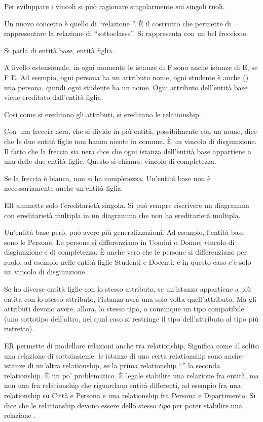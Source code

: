 Per sviluppare i vincoli si pu\`o ragionare singolarmente sui singoli ruoli.

Un nuovo concetto \`e quello di ``relazione \isa''. \`E il costrutto che permette di rappresentare la relazione di ``sottoclasse''. Si rappresenta con un bel freccione.

Si parla di entit\`a base, entit\`a figlia.

A livello estensionale, in ogni momento le istanze di F sono anche istanze di E, se F \isa E. Ad esempio, ogni persona ha un attributo nome, ogni studente \`e anche (\isa) una persona, quindi ogni studente ha un nome. Ogni attributo dell'entit\`a base viene ereditato dall'entit\`a figlia.

Cos\`i come si ereditano gli attributi, si ereditano le relationship.

Con una freccia nera, che si divide in pi\`u entit\`a, possibilmente con un nome, dice che le due entit\`a figlie non hanno niente in comune. \`E un vincolo di disgiunzione. Il fatto che la freccia sia nera dice che ogni istanza dell'entit\`a base appartiene a una delle due entit\`a figlie. Questo si chiama: vincolo di completezza.

Se la freccia \`e bianca, non si ha completezza. Un'entit\`a base non \`e necessariamente anche un'entit\`a figlia.

ER ammette solo l'ereditariet\`a singola. Si pu\`o sempre riscrivere un diagramma con ereditariet\`a multipla in un diagramma che non ha ereditariet\`a multipla.

Un'entit\`a base per\`o, pu\`o avere pi\`u generalizzazioni. Ad esempio, l'entit\`a base sono le Persone. Le persone si differenziano in Uomini o Donne: vincolo di disgiunzione e di completezza. \`E anche vero che le persone si differenziano per ruolo, ad esempio nelle entit\`a figlie Studenti e Docenti, e in questo caso c'\`e solo un vincolo di disgiunzione.

Se ho diverse entit\`a figlie con lo stesso attributo, se un'istanza appartiene a pi\`u entit\`a con lo stesso attributo, l'istanza avr\`a una solo volta quell'attributo. Ma gli attributi devono avere, allora, lo stesso tipo, o comunque un tipo compatibile (uno sottotipo dell'altro, nel qual caso si restringe il tipo dell'attributo al tipo pi\`u ristretto).

ER permette di modellare relazioni \isa anche tra relationship. Significa come al solito una relazione di sottoinsieme: le istanze di una certa relationship sono anche istanze di un'altra relationship, se la prima relationship ``\isa'' la seconda relationship. \`E un po' problematico. \`E legale stabilire una relazione \isa fra entit\`a, ma non una \isa fra relationship che riguardano entit\`a differenti, ad esempio fra una relationship su Citt\`a e Persona e una relationship fra Persona e Dipartimento. Si dice che le relationship devono essere dello stesso \emph{tipo} per poter stabilire una relazione \isa.

